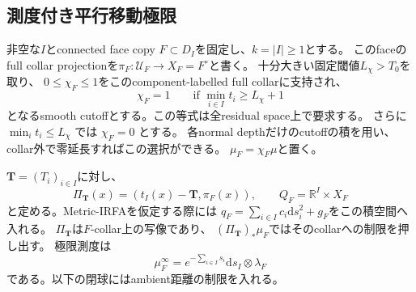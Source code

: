 \documentclass[11pt,a4paper]{ltjsarticle}
\newcommand{\RR}{\mathbb R}
\newcommand{\dd}{\mathrm d}
\theoremstyle{plain}
\theoremstyle{definition}
\theoremstyle{remark}
\begin{document}
\subsection{測度付き平行移動極限}
非空な$I$とconnected face copy $F\subset D_I$を固定し、$k=|I|\ge1$とする。
このfaceのfull collar projectionを$\pi_F:\mathcal U_F\to X_F=F^\circ$と書く。
十分大きい固定閾値$L_\chi>T_0$を取り、
$0\le\chi_F\le1$をこのcomponent-labelled full collarに支持され、
\[
 \chi_F=1\qquad\text{if }\min_{i\in I}t_i\ge L_\chi+1
\]
となるsmooth cutoffとする。この等式は全residual space上で要求する。
さらに $\min_i t_i\le L_\chi$ では $\chi_F=0$ とする。
各normal depthだけのcutoffの積を用い、collar外で零延長すればこの選択ができる。
$\mu_F=\chi_F\mu$と置く。

$\bm T=(T_i)_{i\in I}$に対し、
\[
 \Pi_{\bm T}(x)=(t_I(x)-\bm T,\pi_F(x)),\qquad
 Q_F=\RR^I\times X_F
\]
と定める。Metric-IRFAを仮定する際には
$q_F=\sum_{i\in I}c_i\dd s_i^2+g_F$をこの積空間へ入れる。
$\Pi_{\bm T}$は$F$-collar上の写像であり、
$(\Pi_{\bm T})_*\mu_F$ではそのcollarへの制限を押し出す。
極限測度は
\[
 \mu_F^\infty=e^{-\sum_{i\in I}s_i}\dd s_I\otimes\lambda_F
\]
である。以下の閉球にはambient距離の制限を入れる。
\end{document}
